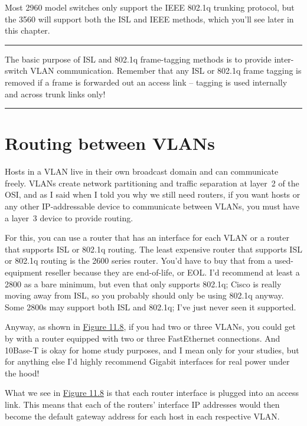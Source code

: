 \documentclass[b5paper,11pt]{memoir}
\begin{document}
Most 2960 model switches only support the IEEE 802.1q trunking protocol,
but the 3560 will support both the ISL and IEEE methods, which you'll
see later in this chapter.

\begin{center}\rule{0.5\linewidth}{0.5pt}\end{center}

The basic purpose of ISL and 802.1q
frame-tagging methods is to provide inter-switch VLAN communication.
Remember that any ISL or 802.1q frame tagging is removed if a frame is
forwarded out an access link -- tagging is used internally and across
trunk links only!

\begin{center}\rule{0.5\linewidth}{0.5pt}\end{center}



\section{Routing between VLANs}

Hosts in a VLAN live in their own broadcast domain and can communicate freely.
VLANs create network partitioning and traffic separation at layer~2 of the OSI, and as I said when I told you why we still need
routers, if you want hosts or any other IP-addressable device to communicate between VLANs, you must have a layer~3 device to provide routing.

For this, you can use a router that has an interface for each VLAN or a
router that supports ISL or 802.1q routing. The least expensive router
that supports ISL or 802.1q routing is the 2600 series router. You'd
have to buy that from a used-equipment reseller because they are
end-of-life, or EOL. I'd recommend at least a 2800 as a bare minimum,
but even that only supports 802.1q; Cisco is really moving away from
ISL, so you probably should only be using 802.1q anyway. Some 2800s may
support both ISL and 802.1q; I've just never seen it supported.

Anyway, as shown in
\protect\hyperlink{c11.xhtmlux5cux23figure11-8}{Figure 11.8}, if you had
two or three VLANs, you could get by with a router equipped with two or
three FastEthernet connections. And 10Base-T is okay for home study
purposes, and I mean only for your studies, but for anything else I'd
highly recommend Gigabit interfaces for real power under the hood!

What we see in \protect\hyperlink{c11.xhtmlux5cux23figure11-8}{Figure
11.8} is that each router interface is plugged into an access link. This
means that each of the routers' interface IP addresses would then become
the default gateway address for each host in each respective VLAN.
\end{document}
